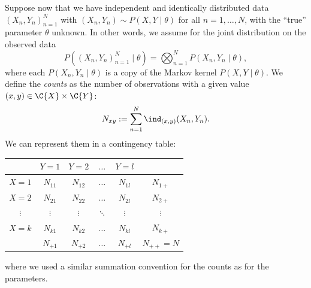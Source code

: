 Suppose now that we have independent and identically distributed data $(X_n,Y_n)_{n=1}^N$ with
$(X_n,Y_n) \sim P(X,Y \mid \theta)$ for all $n=1,\dots,N$, with the ``true'' parameter $\theta$
unknown.
In other words, we assume for the joint distribution on the observed data
$$P((X_n,Y_n)_{n=1}^N \mid \theta) = \bigotimes_{n=1}^N P(X_n,Y_n \mid \theta),$$
where each $P(X_n,Y_n \mid \theta)$ is a copy of the Markov kernel $P(X,Y \mid \theta)$.
We define the \emph{counts} as the number of observations with a given value $(x,y)\in\C{X}\times\C{Y}$:
$$N_{xy} := \sum_{n=1}^N \ind_{(x,y)}(X_n,Y_n).$$
We can represent them in a contingency table:
\begin{center}\begin{tabular}{c|cccc|c}
  & $Y=1$         & $Y=2$ & $\dots$ & $Y=l$ \\
  \hline
  $X=1$ & $N_{11}$      & $N_{12}$      & $\dots$ & $N_{1l}$ & $N_{1+}$\\
  $X=2$ & $N_{21}$      & $N_{22}$      & $\dots$ & $N_{2l}$ & $N_{2+}$\\
  $\vdots$ & $\vdots$     & $\vdots$       & $\ddots$ & $\vdots$  & $\vdots$ \\
  $X=k$ & $N_{k1}$      & $N_{k2}$      & $\dots$ & $N_{kl}$ & $N_{k+}$ \\
  \hline
  & $N_{+ 1}$ & $N_{+ 2}$ & $\dots$ & $N_{+ l}$ & $N_{++} = N$\\
\end{tabular}\end{center}
where we used a similar summation convention for the counts as for the parameters.

